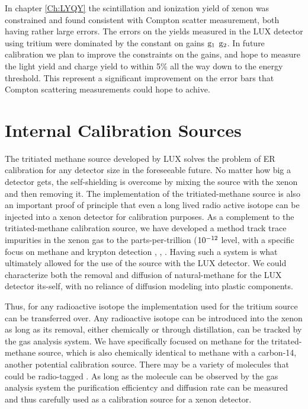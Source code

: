 In chapter \ref{Ch:LYQY} the scintillation and ionization yield of xenon was constrained and found consistent with Compton scatter measurement, both having rather large errors. The errors on the yields measured in the LUX detector using tritium were dominated by the constant on gains $\rm g_1$ $\rm g_2$. In future calibration we plan to improve the constraints on the gains, and hope to measure the light yield and charge yield to within 5\% all the way down to the energy threshold. This represent a significant improvement on the error bars that Compton scattering measurements could hope to achive. 

\section{Internal Calibration Sources}
The tritiated methane source developed by LUX solves the problem of ER calibration for any detector size in the foreseeable future. No matter how big a detector gets, the self-shielding is overcome by mixing the source with the xenon and then removing it. The implementation of the tritiated-methane source is also an important proof of principle that even a long lived radio active isotope can be injected into a xenon detector for calibration purposes. As a complement to the tritiated-methane calibration source, we have developed a method track trace impurities in the xenon gas to the parts-per-trillion ($\rm 10^{-12}$ level, with a specific focus on methane and krypton detection \cite{coldtrap}, \cite{Dobi_CH4}, \cite{Kr_ppt_Dobi}. Having such a system is what ultimately allowed for the use of the source with the LUX detector. We could characterize both the removal and diffusion of natural-methane for the LUX detector its-self, with no reliance of diffusion modeling into plastic components. 

Thus, for any radioactive isotope the implementation used for the tritium source can be transferred over. Any radioactive isotope can be introduced into the xenon as long as its removal, either chemically or through distillation, can be tracked by the gas analysis system. We have specifically focused on methane for the tritated-methane source, which is also chemically identical to methane with a carbon-14, another potential calibration source. There may be a variety of molecules that could be radio-tagged . As long as the molecule can be observed by the gas analysis system the purification efficientcy and diffusion rate can be measured and thus carefully used as a calibration source for a xenon detector. 

